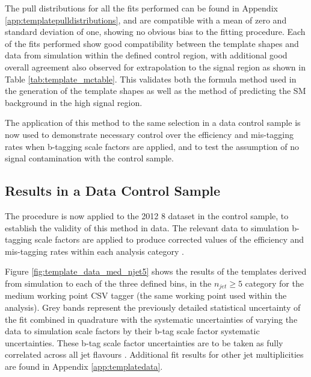 The pull distributions for all the fits performed can be found in Appendix \ref{app:templatepulldistributions}, and are compatible with a mean of zero and standard deviation of one, showing no obvious bias to the fitting procedure. Each of the fits performed show good compatibility between the template shapes and data from simulation within the defined control region, with additional good overall agreement also observed for extrapolation to the signal region as shown in Table \ref{tab:template_mctable}. This validates both the formula method used in the generation of the template shapes as well as the method of predicting the \ac{SM} background in the high \nbreco signal region. 

The application of this method to the same selection in a data control sample is now used to demonstrate necessary control over the efficiency and mis-tagging rates when b-tagging scale factors are applied, and to test the assumption of no signal contamination with the \mupjets control sample.

\subsection{Results in a Data Control Sample}
\label{subsec:templatedataresults}

The procedure is now applied to the 2012 8 \TeV dataset in the \mupjets control sample, to establish the validity of this method in data. The relevant data to simulation b-tagging scale factors are applied to produce corrected values of the efficiency and mis-tagging rates within each analysis category \cite{btagscalefactor}. 

Figure \ref{fig:template_data_med_njet5} shows the results of the templates derived from simulation to each of the three defined \theht bins, in the $n_{jet} \geq 5$ category for the medium working point \ac{CSV} tagger (the same working point used within the \alphat analysis).  Grey bands represent the previously detailed statistical uncertainty of the fit combined in quadrature with the systematic uncertainties of varying the data to simulation scale factors by their b-tag scale factor systematic uncertainties. These b-tag scale factor uncertainties are to be taken as fully correlated across all jet flavours \cite{btagscalefactor}. Additional fit results for other jet multiplicities are found in Appendix \ref{app:templatedata}.

